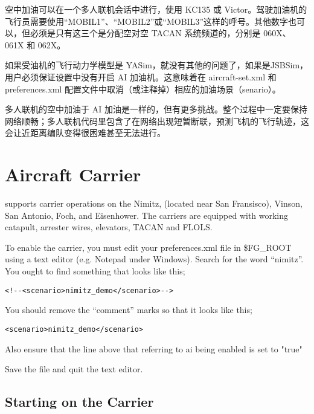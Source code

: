空中加油可以在一个多人联机会话中进行，使用 KC135 或 Victor。驾驶加油机的飞行员需要使用“MOBIL1”、“MOBIL2”或“MOBIL3”这样的呼号。其他数字也可以，但必须是只有这三个是分配空对空 TACAN 系统频道的，分别是 060X、061X 和 062X。

如果受油机的飞行动力学模型是 YASim，就没有其他的问题了，如果是JSBSim，用户必须保证设置中没有开启 AI 加油机。这意味着在 aircraft-set.xml 和 preferences.xml 配置文件中取消（或注释掉）相应的加油场景（senario）。

多人联机的空中加油于 AI 加油是一样的，但有更多挑战。整个过程中一定要保持网络顺畅；多人联机代码里包含了在网络出现短暂断联，预测飞机的飞行轨迹，这会让近距离编队变得很困难甚至无法进行。

\fi

\iffalse
\section{Aircraft Carrier}\label{carrier}

\FlightGear{} supports carrier operations on the Nimitz, (located near San Fransisco), Vinson, San Antonio, Foch, and Eisenhower.
The carriers are equipped with working catapult, arrester wires, elevators, TACAN and FLOLS.

To enable the carrier, you must edit your preferences.xml file in \$FG\_ROOT using a text editor (e.g. Notepad
under Windows). Search for the word ``nimitz''. You ought to find something that looks like this;

\begin{verbatim}
<!--<scenario>nimitz_demo</scenario>-->
\end{verbatim}

You should remove the ``comment'' marks so that it looks like this;


\begin{verbatim}
<scenario>nimitz_demo</scenario>
\end{verbatim}

Also ensure that the line above that referring to ai being enabled is set to "true"

Save the file and quit the text editor.

\subsection{Starting on the Carrier}

